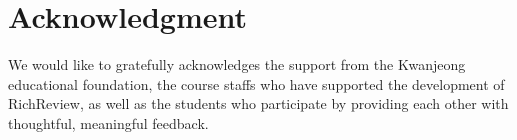 \documentclass{sigchi}
\begin{document}
\section{Acknowledgment} 
We would like to gratefully acknowledges the support from the Kwanjeong educational foundation, the course staffs who have supported the development of RichReview, as well as the students who participate by providing each other with thoughtful, meaningful feedback.



\end{document}
